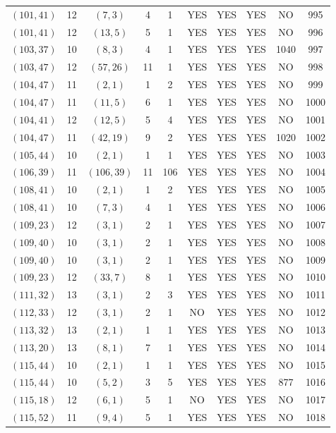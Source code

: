 \begin{longtable}{|c|c|c|c|c|c|c|c|c|c|}
$(101, 41)$ & 12 & $(7, 3)$ & 4 & 1 & YES & YES & YES & NO & 995\\
$(101, 41)$ & 12 & $(13, 5)$ & 5 & 1 & YES & YES & YES & NO & 996\\
$(103, 37)$ & 10 & $(8, 3)$ & 4 & 1 & YES & YES & YES & 1040 & 997\\
$(103, 47)$ & 12 & $(57, 26)$ & 11 & 1 & YES & YES & YES & NO & 998\\
$(104, 47)$ & 11 & $(2, 1)$ & 1 & 2 & YES & YES & YES & NO & 999\\
$(104, 47)$ & 11 & $(11, 5)$ & 6 & 1 & YES & YES & YES & NO & 1000\\
$(104, 41)$ & 12 & $(12, 5)$ & 5 & 4 & YES & YES & YES & NO & 1001\\
$(104, 47)$ & 11 & $(42, 19)$ & 9 & 2 & YES & YES & YES & 1020 & 1002\\
$(105, 44)$ & 10 & $(2, 1)$ & 1 & 1 & YES & YES & YES & NO & 1003\\
$(106, 39)$ & 11 & $(106, 39)$ & 11 & 106 & YES & YES & YES & NO & 1004\\
$(108, 41)$ & 10 & $(2, 1)$ & 1 & 2 & YES & YES & YES & NO & 1005\\
$(108, 41)$ & 10 & $(7, 3)$ & 4 & 1 & YES & YES & YES & NO & 1006\\
$(109, 23)$ & 12 & $(3, 1)$ & 2 & 1 & YES & YES & YES & NO & 1007\\
$(109, 40)$ & 10 & $(3, 1)$ & 2 & 1 & YES & YES & YES & NO & 1008\\
$(109, 40)$ & 10 & $(3, 1)$ & 2 & 1 & YES & YES & YES & NO & 1009\\
$(109, 23)$ & 12 & $(33, 7)$ & 8 & 1 & YES & YES & YES & NO & 1010\\
$(111, 32)$ & 13 & $(3, 1)$ & 2 & 3 & YES & YES & YES & NO & 1011\\
$(112, 33)$ & 12 & $(3, 1)$ & 2 & 1 & NO & YES & YES & NO & 1012\\
$(113, 32)$ & 13 & $(2, 1)$ & 1 & 1 & YES & YES & YES & NO & 1013\\
$(113, 20)$ & 13 & $(8, 1)$ & 7 & 1 & YES & YES & YES & NO & 1014\\
$(115, 44)$ & 10 & $(2, 1)$ & 1 & 1 & YES & YES & YES & NO & 1015\\
$(115, 44)$ & 10 & $(5, 2)$ & 3 & 5 & YES & YES & YES & 877 & 1016\\
$(115, 18)$ & 12 & $(6, 1)$ & 5 & 1 & NO & YES & YES & NO & 1017\\
$(115, 52)$ & 11 & $(9, 4)$ & 5 & 1 & YES & YES & YES & NO & 1018\\

\end{longtable}
